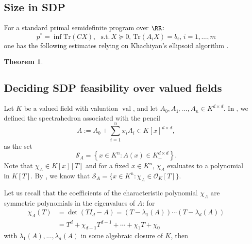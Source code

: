 \documentclass{amsart}
\newtheorem{theorem}{Theorem}[section]
\DeclareMathOperator{\val}{val}
\newcommand{\OK}{\mathcal{O}_K}
\begin{document}
\subsection{Size in SDP}

For a standard primal semidefinite program over $\RR$:
$$
p^* = \inf \mathrm{Tr}(CX), \,\,\,\, \mathrm{ s.t. } \, X \succeq 0, \, \mathrm{Tr}(A_iX) = b_i, \, i=1,\ldots,m
$$
one has the following estimates relying on Khachiyan's ellipsoid algorithm \cite{khachiyan1979polynomial}.

\begin{theorem}
\end{theorem}



\subsection{Deciding SDP feasibility over valued fields}
Let $K$ be a valued field with valuation $\val$, and let $A_0,A_1,\ldots,A_n \in K^{d \times d}$.
In \cite[Def.5.8]{cornou2026}, we defined the spectrahedron associated with the pencil
\begin{equation}\label{pencil}
  A := A_0+\sum_{i=1}^n x_iA_i \in K[x]^{d \times d},
\end{equation}
as the set
\begin{equation}\label{spectrahedron}
  \mathcal{S}_A = \left\{x \in K^n : A(x) \in K^{d \times d}_+\right\}.
\end{equation}
Note that $\chi_A \in K[x][T]$ and for a fixed $x \in K^n$, $\chi_A$ evaluates to a polynomial in
$K[T]$. By \cite[Thm.5.2]{cornou2026}, we know that $\mathcal{S}_A = \{x \in K^n : \chi_{A} \in \OK[T]\}$.

Let us recall that the coefficients of the characteristic polynomial $\chi_A$ are
symmetric polynomials in the eigenvalues of $A$: for
\begin{equation}
  \begin{aligned}
    \chi_A(T) & = \det(T I_d - A) = (T-\lambda_1(A)) \cdots (T-\lambda_d(A)) \\
    & = T^d + \chi_{d-1} T^{d-1} + \cdots + \chi_1 T + \chi_0
  \end{aligned}
\end{equation}
with $\lambda_1(A),\ldots,\lambda_d(A)$ in some algebraic closure of $K$, then
\end{document}
